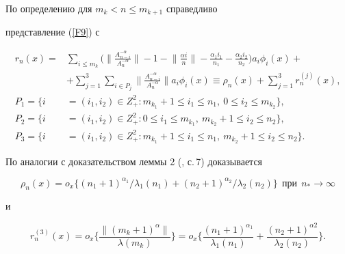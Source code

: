По определению для $m_k<n\le m_{k+1}$ справедливо


представление (\ref{F9}) с


\begin{align*}


r_n(x)=&\sum_{i\le m_k} \bigg( \bigg\| \frac{A_{n-i}^{-\alpha }}{ A_n^{-\alpha }


}\bigg\| -1-\bigg\| \frac{\alpha i}{n}\bigg\| -\frac{\alpha_1 i_1}{n_1}


-\frac{\alpha_2 i_2}{n_2} \bigg) a_i \phi_i(x) + \\


%


&+\sum_{j=1}^3\sum_{i\in P_j} \bigg\| \frac{A_{n-i}^{-\alpha }}{A_{n}^{-\alpha


}}\bigg\| a_i\phi_i(x)\equiv \rho_n(x) +\sum_{j=1}^3 r_n^{(j)}(x), \\


%


P_1= \{ i&=(i_1,i_2) \in Z^2_+: m_{k_1}+1\le i_1\le n_1, 


\ 0\le i_2\le m_{k_2} \}, \\


%


P_2= \{ i&=(i_1,i_2) \in Z^2_+: 0\le i_1 \le m_{k_1},


\ m_{k_2}+1\le i_2\le n_2 \}, \\


%


P_3= \{i&=(i_1,i_2)\in Z^2_+: m_{k_1}+1\le i_1 \le n_1,


\ m_{k_2}+1\le i_2\le n_2 \}.


\end{align*}


По аналогии с доказательством леммы 2 (\cite{l5}, с.\,7) доказывается


$$




\rho_n(x)=o_x \{(n_1+1)^{\alpha_1}/\lambda_1(n_1) +


(n_2+1)^{\alpha_2}/\lambda_2(n_2) \} \ \ \text{при} \ \ n_* \to \infty




$$


и


\begin{equation}


\label{F17}


r_n^{(3)}(x)=o_x \bigg\{\frac{\| (m_k+1)^\alpha \| }{\lambda (m_k)}


\bigg\}=o_x \bigg\{ \frac{(n_1+1)^{\alpha_1}}{\lambda_1(n_1)}+


\frac{(n_2+1)^{\alpha2}}{\lambda_2(n_2)}\bigg \}.


\end{equation}


